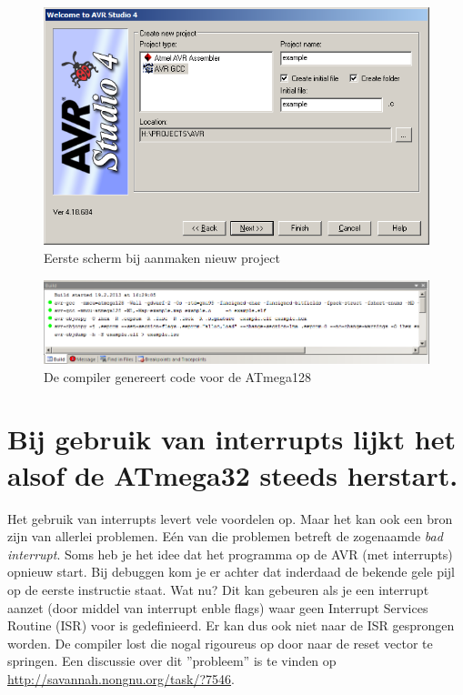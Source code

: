 \documentclass[12pt,a4paper,final,oneside,fleqn]{article}
\begin{document}
\begin{figure}[h!]
  \centering
  \includegraphics[scale=0.46]{newproject1}
  \caption{Eerste scherm bij aanmaken nieuw project}
  \label{fig:newproject1}
\end{figure}

\begin{figure}[h!]
  \centering
  \includegraphics[scale=0.46]{atmega128gcc}
  \caption{De compiler genereert code voor de ATmega128}
  \label{fig:atmega128gcc}
\end{figure}

\section{Bij gebruik van interrupts lijkt het alsof de ATmega32 steeds herstart.}
Het gebruik van interrupts levert vele voordelen op. Maar het kan ook een bron zijn van
allerlei problemen. E\'{e}n van die problemen betreft de zogenaamde \textit{bad interrupt}.
Soms heb je het idee dat het programma op de AVR (met interrupts) opnieuw start. Bij debuggen
kom je er achter dat inderdaad de bekende gele pijl op de eerste instructie staat. Wat nu?
Dit kan gebeuren als je een interrupt aanzet (door middel van interrupt enble flags) waar
geen Interrupt Services Routine (ISR) voor is gedefinieerd. Er kan dus ook niet naar de ISR
gesprongen worden. De compiler lost die nogal rigoureus op door naar de reset vector te
springen. Een discussie over dit ''probleem'' is te vinden op
\url{http://savannah.nongnu.org/task/?7546}.
\end{document}
